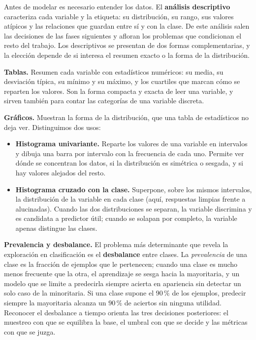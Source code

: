 \documentclass[12pt,a4paper]{report}
\theoremstyle{definition}
\begin{document}
Antes de modelar es necesario entender los datos. El \textbf{análisis descriptivo} caracteriza cada variable y
la etiqueta: su distribución, su rango, sus valores atípicos y las relaciones que guardan entre sí y
con la clase. De este análisis salen las decisiones de las fases siguientes y afloran los problemas que
condicionan el resto del trabajo. Los descriptivos se presentan de dos formas complementarias, y la
elección depende de si interesa el resumen exacto o la forma de la distribución.

\medskip
\noindent\textbf{Tablas.} Resumen cada variable con estadísticos numéricos: su media, su desviación
típica, su mínimo y su máximo, y los cuartiles que marcan cómo se reparten los valores. Son la forma
compacta y exacta de leer una variable, y sirven también para contar las categorías de una variable
discreta.

\medskip
\noindent\textbf{Gráficos.} Muestran la forma de la distribución, que una tabla de estadísticos no deja
ver. Distinguimos dos usos:
\begin{itemize}
\item \textbf{Histograma univariante.} Reparte los valores de una variable en intervalos y dibuja una
barra por intervalo con la frecuencia de cada uno. Permite ver dónde se concentran los
datos, si la distribución es simétrica o sesgada, y si hay valores alejados del resto.
\item \textbf{Histograma cruzado con la clase.} Superpone, sobre los mismos intervalos, la distribución
de la variable en cada clase (aquí, respuestas limpias frente a alucinadas). Cuando las dos
distribuciones se separan, la variable discrimina y es candidata a predictor útil; cuando se solapan
por completo, la variable apenas distingue las clases.
\end{itemize}

\medskip
\noindent\textbf{Prevalencia y desbalance.} El problema más determinante que revela la exploración en
clasificación es el \textbf{desbalance} entre clases. La \emph{prevalencia} de una clase es la fracción
de ejemplos que le pertenecen; cuando una clase es mucho menos frecuente que la otra, el aprendizaje se
sesga hacia la mayoritaria, y un modelo que se limite a predecirla siempre acierta en apariencia sin
detectar un solo caso de la minoritaria. Si una clase supone el $90\,\%$ de los ejemplos, predecir
siempre la mayoritaria alcanza un $90\,\%$ de aciertos sin ninguna utilidad. Reconocer el desbalance a tiempo
orienta las tres decisiones posteriores: el muestreo con que se equilibra la base, el umbral con que se
decide y las métricas con que se juzga.
\end{document}
